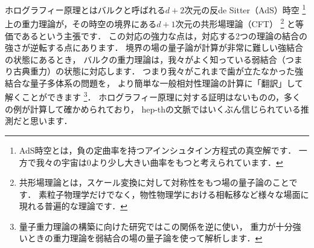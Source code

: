 \documentclass[b5paper,11pt,dvipdfmx]{jsarticle}
\numberwithin{equation}{section}
\theoremstyle{definition}
\begin{document}
ホログラフィー原理とはバルクと呼ばれる$d + 2$次元の反de Sitter（AdS）時空
\footnote{AdS時空とは，負の定曲率を持つアインシュタイン方程式の真空解です．
一方で我々の宇宙は$0$より少し大きい曲率をもつと考えられています．}
上の重力理論が，その時空の境界にある$d + 1$次元の共形場理論（CFT）
\footnote{共形場理論とは，スケール変換に対して対称性をもつ場の量子論のことです．
素粒子物理学だけでなく，物性物理学における相転移など様々な場面に現れる普遍的な理論です．}
と等価であるという主張です．
この対応の強力な点は，対応する2つの理論の結合の強さが逆転する点にあります．
境界の場の量子論が計算が非常に難しい強結合の状態にあるとき，
バルクの重力理論は，我々がよく知っている弱結合（つまり古典重力）の状態に対応します．
つまり我々がこれまで歯が立たなかった強結合な量子多体系の問題を，
より簡単な一般相対性理論の計算に「翻訳」して解くことができます
\footnote{量子重力理論の構築に向けた研究ではこの関係を逆に使い，
重力が十分強いときの重力理論を弱結合の場の量子論を使って解析します．}．
ホログラフィー原理に対する証明はないものの，多くの例が計算して確かめられており，
hep-thの文脈ではいくぶん信じられている推測だと思います．
\end{document}
